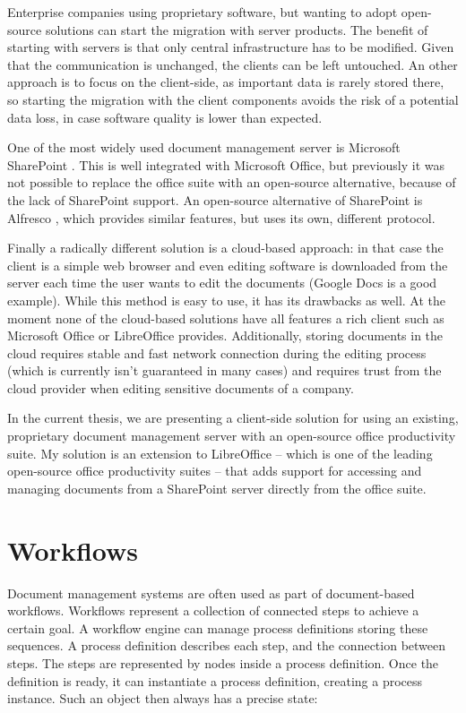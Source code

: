 Enterprise companies using proprietary software, but wanting to adopt
open-source solutions can start the migration with server products. The benefit
of starting with servers is that only central infrastructure has to be
modified. Given that the communication is unchanged, the clients can be left
untouched. An other approach is to focus on the client-side, as important data
is rarely stored there, so starting the migration with the client components
avoids the risk of a potential data loss, in case software quality is lower
than expected.

One of the most widely used document management server is Microsoft
SharePoint \cite{sharepoint}. This is well integrated with Microsoft Office, but
previously it was not possible to replace the office suite with an open-source
alternative, because of the lack of SharePoint support. An open-source
alternative of SharePoint is Alfresco \cite{alfresco}, which provides similar
features, but uses its own, different protocol.

Finally a radically different solution is a cloud-based approach: in that case
the client is a simple web browser and even editing software is downloaded from
the server each time the user wants to edit the documents (Google
Docs \cite{google-docs} is a good example). While this method is easy to use, it
has its drawbacks as well. At the moment none of the cloud-based solutions have
all features a rich client such as Microsoft Office or LibreOffice provides.
Additionally, storing documents in the cloud requires stable and fast network
connection during the editing process (which is currently isn't guaranteed in many
cases) and requires trust from the cloud provider when editing sensitive
documents of a company.

In the current thesis, we are presenting a client-side solution for using an
existing, proprietary document management server with an open-source office
productivity suite. My solution is an extension to LibreOffice -- which is one
of the leading open-source office productivity suites -- that adds support for
accessing and managing documents from a SharePoint server directly from the
office suite.

\section{Workflows}

Document management systems are often used as part of document-based workflows.
Workflows represent a collection of connected steps to achieve a certain goal.
A workflow engine can manage process definitions storing these sequences. A
process definition describes each step, and the connection between steps. The
steps are represented by nodes inside a process definition. Once the definition
is ready, it can instantiate a process definition, creating a process instance.
Such an object then always has a precise state:

